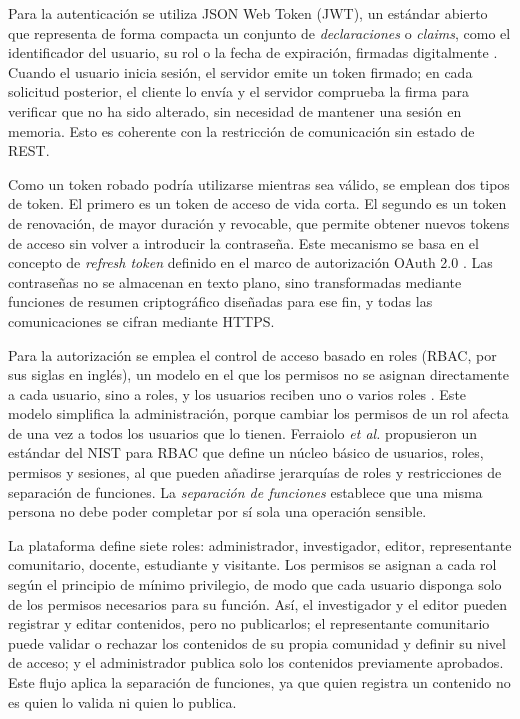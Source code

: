 Para la autenticación se utiliza JSON Web Token (JWT), un estándar abierto que representa de forma compacta un conjunto de \textit{declaraciones} o \textit{claims}, como el identificador del usuario, su rol o la fecha de expiración, firmadas digitalmente \cite{jones2015jwt}. Cuando el usuario inicia sesión, el servidor emite un token firmado; en cada solicitud posterior, el cliente lo envía y el servidor comprueba la firma para verificar que no ha sido alterado, sin necesidad de mantener una sesión en memoria. Esto es coherente con la restricción de comunicación sin estado de REST.

Como un token robado podría utilizarse mientras sea válido, se emplean dos tipos de token. El primero es un token de acceso de vida corta. El segundo es un token de renovación, de mayor duración y revocable, que permite obtener nuevos tokens de acceso sin volver a introducir la contraseña. Este mecanismo se basa en el concepto de \textit{refresh token} definido en el marco de autorización OAuth 2.0 \cite{hardt2012oauth}. Las contraseñas no se almacenan en texto plano, sino transformadas mediante funciones de resumen criptográfico diseñadas para ese fin, y todas las comunicaciones se cifran mediante HTTPS.

Para la autorización se emplea el control de acceso basado en roles (RBAC, por sus siglas en inglés), un modelo en el que los permisos no se asignan directamente a cada usuario, sino a roles, y los usuarios reciben uno o varios roles \cite{sandhu1996rbac}. Este modelo simplifica la administración, porque cambiar los permisos de un rol afecta de una vez a todos los usuarios que lo tienen. Ferraiolo \textit{et al.} \cite{ferraiolo2001nist} propusieron un estándar del NIST para RBAC que define un núcleo básico de usuarios, roles, permisos y sesiones, al que pueden añadirse jerarquías de roles y restricciones de separación de funciones. La \textit{separación de funciones} establece que una misma persona no debe poder completar por sí sola una operación sensible.

La plataforma define siete roles: administrador, investigador, editor, representante comunitario, docente, estudiante y visitante. Los permisos se asignan a cada rol según el principio de mínimo privilegio, de modo que cada usuario disponga solo de los permisos necesarios para su función. Así, el investigador y el editor pueden registrar y editar contenidos, pero no publicarlos; el representante comunitario puede validar o rechazar los contenidos de su propia comunidad y definir su nivel de acceso; y el administrador publica solo los contenidos previamente aprobados. Este flujo aplica la separación de funciones, ya que quien registra un contenido no es quien lo valida ni quien lo publica.

